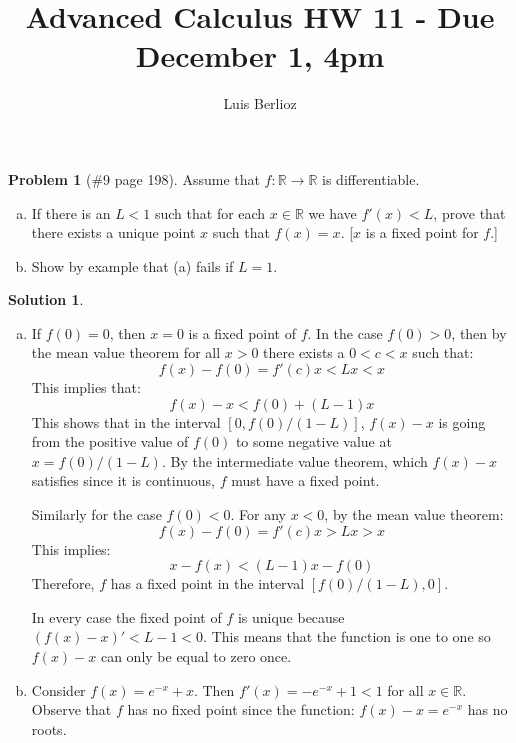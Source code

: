 \documentclass{article}
\theoremstyle{definition}
\newtheorem*{soln}{Solution}
\newtheorem*{prob}{Problem}
\theoremstyle{theorem}
\newcommand{\R}{\mathbb{R}}
\begin{document}
\title{Advanced Calculus HW 11 - Due December 1, 4pm}
\author{Luis Berlioz}
\maketitle



\begin{prob}[\#9 page 198]
    Assume that $f: \R \to \R$ is differentiable.
    \begin{enumerate}[(a)]
        \item If there is an $L<1$ such that for each $x\in \R$ we have $f'(x)<L$, prove that there exists a unique point $x$ such that $f(x) =x$. [$x$ is a fixed point for $f$.]        
        \item Show by example that (a) fails if $L=1$.
    \end{enumerate}
\end{prob}
\begin{soln}
    \begin{enumerate}[(a)]
        \item If $f(0)=0$, then $x=0$ is a fixed point of $f$. In the case $f(0)>0$, then by the mean value theorem for all $x>0$ there exists a $0< c< x$ such that:
            $$f(x) - f(0) = f'(c)x < Lx < x$$
            This implies that:
            $$f(x) -x < f(0) +(L-1)x$$
            This shows that  in the interval $[0,f(0)/(1-L)]$, $f(x) -x$ is going from the positive value of $f(0)$ to some negative value at $x=f(0)/(1-L)$. By the intermediate value theorem, which $f(x) - x$ satisfies since it is continuous, $f$ must have a fixed point.

            Similarly for the case $f(0)<0$. For any $x<0$, by the mean value theorem:
            $$f(x) - f(0) = f'(c)x > Lx > x$$
            This implies:
            $$x-f(x) < (L-1)x -f(0)$$
            Therefore, $f$ has a fixed point in the interval $[f(0)/(1-L), 0]$.

            In every case the fixed point of $f$ is  unique because $(f(x)-x)' < L-1<0$. This means that the function is one to one so $f(x)-x$ can only be equal to zero once.

        \item Consider $f(x) = e^{-x } +x$. Then $f'(x) = -e^{-x }+1<1$ for all $x\in \R$. Observe that $f$ has no fixed point since the function: $f(x)-x = e^{-x }$ has no roots.
    \end{enumerate}
\end{soln}
\vspace{1in}
\end{document}
